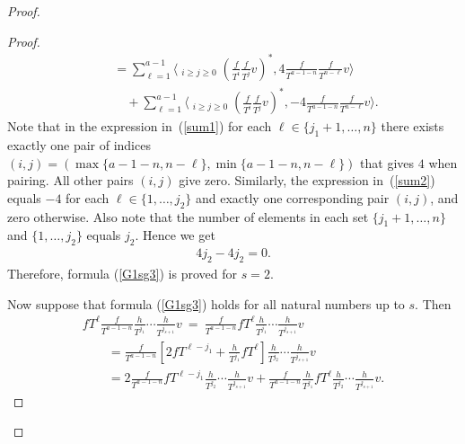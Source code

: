 \documentclass[pdftex]{sigma}
\numberwithin{equation}{section}
\begin{document}
\begin{proof}
\begin{proof}
\begin{gather}
\qquad{} = \sum_{\ell=1}^{a-1} \bigg\langle \mathop{\sum_{i+j=a-1-\ell}}_{i\geq j\geq 0}
\left(\frac{f}{T^i}\frac{f}{T^j}v\right)^*, 4 \frac{f}{T^{a-1-n}} \frac{f}{T^{n-\ell}} v \bigg\rangle \label{sum1} \\
\qquad\quad{} + \sum_{\ell=1}^{a-1} \bigg\langle \mathop{\sum_{i+j=a-1-\ell}}_{i\geq j\geq 0} \left(\frac{f}{T^i}\frac{f}{T^j}v\right)^*, -4 \frac{f}{T^{a-1-n}} \frac{f}{T^{n-\ell}} v \bigg\rangle. \label{sum2}
\end{gather}
Note that in the expression in~(\ref{sum1}) for each $\ell \in \{j_1 +1, \dots, n \}$ there exists exactly one pair of indices $(i,j) = (\max \{a-1-n, n-\ell \} , \min \{a-1-n, n-\ell\})$ that gives $4$ when pairing. All other pairs $(i,j)$ give zero. Similarly, the expression in~(\ref{sum2}) equals $-4$ for each $\ell \in \{1, \dots, j_2 \}$ and exactly one corresponding pair $(i,j)$, and zero otherwise. Also note that the number of elements in each set $\{j_1 +1, \dots, n \}$ and $\{1, \dots, j_2 \}$ equals $j_2$. Hence we get
\begin{gather*}
4 j_2 - 4 j_2 = 0.
\end{gather*}
Therefore, formula (\ref{G1sg3}) is proved for $s=2$.

Now suppose that formula (\ref{G1sg3}) holds for all natural numbers up to $s$. Then
\begin{gather}
fT^{\ell} \frac{f}{T^{a-1-n}} \frac{h}{T^{j_1}} \cdots \frac{h}{T^{j_{s+1}}} v\ =\
 \frac{f}{T^{a-1-n}} fT^{\ell} \frac{h}{T^{j_1}} \cdots \frac{h}{T^{j_{s+1}}} v \nonumber \\
\qquad{} = \frac{f}{T^{a-1-n}} \left[ 2 fT^{\ell-j_1} + \frac{h}{T^{j_1}} fT^{\ell} \right] \frac{h}{T^{j_2}} \cdots \frac{h}{T^{j_{s+1}}} v \nonumber \\
\qquad{} = 2 \frac{f}{T^{a-1-n}} fT^{\ell-j_1} \frac{h}{T^{j_2}} \cdots \frac{h}{T^{j_{s+1}}} v + \frac{f}{T^{a-1-n}} \frac{h}{T^{j_1}} fT^{\ell} \frac{h}{T^{j_2}} \cdots \frac{h}{T^{j_{s+1}}} v. \label{fs sum2}
\end{gather}


\end{proof}
\end{proof}
\end{document}
